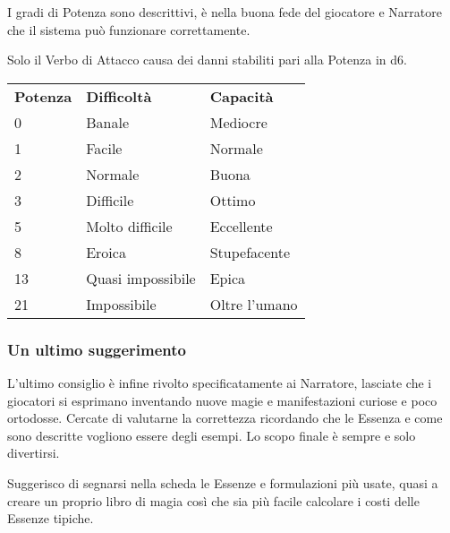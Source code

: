 \documentclass[a4paper,twoside,openany]{book}
\begin{document}
\begin{multicols}{2}
I gradi di Potenza sono descrittivi, è nella buona fede del giocatore e Narratore che il sistema può funzionare correttamente.

Solo il Verbo di Attacco causa dei danni stabiliti pari alla Potenza in d6.

\medskip

\begin{tabularx}{0.45\textwidth}{lll}
	\toprule
\textbf{Potenza}	&	\textbf{Difficoltà} & \textbf{Capacità}\\

0       & Banale	        & Mediocre	\\
1       & Facile    	    & Normale	\\
2       & Normale       	& Buona		\\
3       & Difficile        	& Ottimo	\\
5       & Molto difficile  	& Eccellente	\\
8       & Eroica    	   	& Stupefacente	\\
13      & Quasi impossibile & Epica	\\
21      & Impossibile     	& Oltre l'umano	\\
\end{tabularx}


\subsubsection{Un ultimo suggerimento}

L'ultimo consiglio è infine rivolto specificatamente ai Narratore, lasciate che i giocatori si esprimano inventando nuove magie e manifestazioni curiose e poco ortodosse. Cercate di valutarne la correttezza ricordando che le Essenza e come sono descritte vogliono essere degli esempi. Lo scopo finale è sempre e solo divertirsi.


\bigskip

Suggerisco di segnarsi nella scheda le Essenze e formulazioni più usate, quasi a creare un proprio libro di magia così che sia più facile calcolare i costi delle Essenze tipiche.




\end{multicols}

\pagebreak

\begin{multicols}{2}
	{\small \tableofcontents{}}
\end{multicols}

\pagebreak{}
\end{document}
